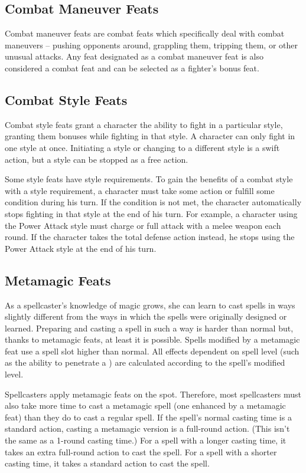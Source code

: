 \subsection{Combat Maneuver Feats}
Combat maneuver feats are combat feats which specifically deal with combat maneuvers -- pushing opponents around, grappling them, tripping them, or other unusual attacks. Any feat designated as a combat maneuver feat is also considered a combat feat and can be selected as a fighter's bonus feat.

\subsection{Combat Style Feats}
Combat style feats grant a character the ability to fight in a particular style, granting them bonuses while fighting in that style. A character can only fight in one style at once. Initiating a style or changing to a different style is a swift action, but a style can be stopped as a free action.

Some style feats have style requirements. To gain the benefits of a combat style with a style requirement, a character must take some action or fulfill some condition during his turn. If the condition is not met, the character automatically stops fighting in that style at the end of his turn. For example, a character using the Power Attack style must charge or full attack with a melee weapon each round. If the character takes the total defense action instead, he stops using the Power Attack style at the end of his turn.

\subsection{Metamagic Feats}
As a spellcaster's knowledge of magic grows, she can learn to cast spells in ways slightly different from the ways in which the spells were originally designed or learned. Preparing and casting a spell in such a way is harder than normal but, thanks to metamagic feats, at least it is possible. Spells modified by a metamagic feat use a spell slot higher than normal. All effects dependent on spell level (such as the ability to penetrate a ) are calculated according to the spell's modified level.

 Spellcasters apply metamagic feats on the spot. Therefore, most spellcasters must also take more time to cast a metamagic spell (one enhanced by a metamagic feat) than they do to cast a regular spell. If the spell's normal casting time is a standard action, casting a metamagic version is a full-round action. (This isn't the same as a 1-round casting time.) For a spell with a longer casting time, it takes an extra full-round action to cast the spell. For a spell with a shorter casting time, it takes a standard action to cast the spell.

